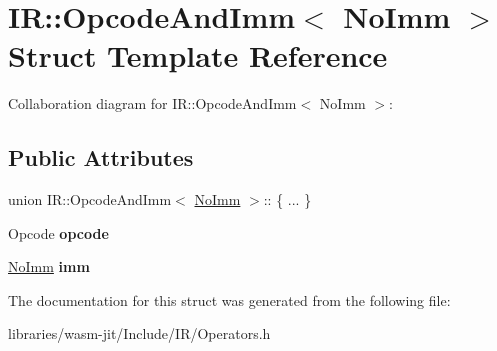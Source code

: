 \hypertarget{struct_i_r_1_1_opcode_and_imm_3_01_no_imm_01_4}{}\section{IR\+:\+:Opcode\+And\+Imm$<$ No\+Imm $>$ Struct Template Reference}
\label{struct_i_r_1_1_opcode_and_imm_3_01_no_imm_01_4}


Collaboration diagram for IR\+:\+:Opcode\+And\+Imm$<$ No\+Imm $>$\+:
\subsection*{Public Attributes}
\begin{DoxyCompactItemize}
\item 
\mbox{\label{struct_i_r_1_1_opcode_and_imm_3_01_no_imm_01_4_ad94dbbd9676b2fd46339090a32b07bae}} 
union I\+R\+::\+Opcode\+And\+Imm$<$ \mbox{\hyperlink{struct_i_r_1_1_no_imm}{No\+Imm}} $>$\+:: \{ ... \}  
\item 
\mbox{\label{struct_i_r_1_1_opcode_and_imm_3_01_no_imm_01_4_ae655d376f3ff85908e5769f81357a9e1}} 
Opcode {\bfseries opcode}
\item 
\mbox{\label{struct_i_r_1_1_opcode_and_imm_3_01_no_imm_01_4_a75df95868f32fdb8386f3beb5aea0e29}} 
\mbox{\hyperlink{struct_i_r_1_1_no_imm}{No\+Imm}} {\bfseries imm}
\end{DoxyCompactItemize}


The documentation for this struct was generated from the following file\+:\begin{DoxyCompactItemize}
\item 
libraries/wasm-\/jit/\+Include/\+I\+R/Operators.\+h\end{DoxyCompactItemize}
